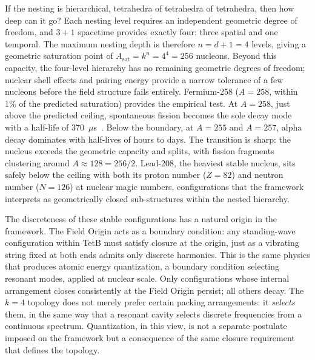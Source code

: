 \documentclass[aps,prd,preprint,superscriptaddress,showpacs,preprintnumbers,amsmath,amssymb,nofootinbib]{revtex4-2}
\begin{document}
If the nesting is hierarchical, tetrahedra of tetrahedra of tetrahedra, then how deep can it go? Each nesting level requires an independent geometric degree of freedom, and $3 + 1$ spacetime provides exactly four: three spatial and one temporal. The maximum nesting depth is therefore $n = d + 1 = 4$ levels, giving a geometric saturation point of $A_{\text{sat}} = k^n = 4^4 = 256$ nucleons. Beyond this capacity, the four-level hierarchy has no remaining geometric degrees of freedom; nuclear shell effects and pairing energy provide a narrow tolerance of a few nucleons before the field structure fails entirely. Fermium-258 ($A = 258$, within 1\% of the predicted saturation) provides the empirical test. At $A = 258$, just above the predicted ceiling, spontaneous fission becomes the sole decay mode with a half-life of 370~$\mu$s~\cite{hoffman2000}. Below the boundary, at $A = 255$ and $A = 257$, alpha decay dominates with half-lives of hours to days. The transition is sharp: the nucleus exceeds the geometric capacity and splits, with fission fragments clustering around $A \approx 128 = 256/2$. Lead-208, the heaviest stable nucleus, sits safely below the ceiling with both its proton number ($Z = 82$) and neutron number ($N = 126$) at nuclear magic numbers, configurations that the framework interprets as geometrically closed sub-structures within the nested hierarchy.

The discreteness of these stable configurations has a natural origin in the framework. The Field Origin acts as a boundary condition: any standing-wave configuration within TetB must satisfy closure at the origin, just as a vibrating string fixed at both ends admits only discrete harmonics. This is the same physics that produces atomic energy quantization, a boundary condition selecting resonant modes, applied at nuclear scale. Only configurations whose internal arrangement closes consistently at the Field Origin persist; all others decay. The $k = 4$ topology does not merely prefer certain packing arrangements: it \emph{selects} them, in the same way that a resonant cavity selects discrete frequencies from a continuous spectrum. Quantization, in this view, is not a separate postulate imposed on the framework but a consequence of the same closure requirement that defines the topology.
\end{document}
